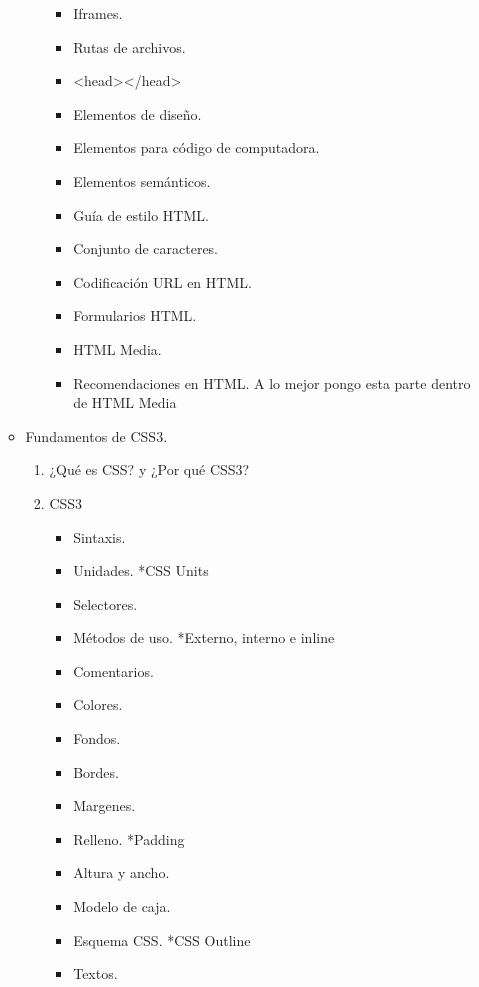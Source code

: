 \documentclass[12pt, letterpaper]{article}
\begin{document}
\begin{enumerate}
\begin{itemize}
\begin{enumerate}
\begin{itemize}
                \item Iframes.
                \item Rutas de archivos.
                \item <head></head>
                \item Elementos de diseño.
                \item Elementos para código de computadora.
                \item Elementos semánticos.
                \item Guía de estilo HTML.
                \item Conjunto de caracteres.
                \item Codificación URL en HTML.
                \item Formularios HTML.
                \item HTML Media.
                \item Recomendaciones en HTML. \newline*A lo mejor pongo esta parte dentro de HTML Media
            \end{itemize}
        \end{enumerate}
        \item Fundamentos de CSS3.
        \begin{enumerate}
            \item ¿Qué es CSS? y ¿Por qué CSS3?
            \item CSS3
            \begin{itemize}
                \item Sintaxis.
                \item Unidades. *CSS Units
                \item Selectores.
                \item Métodos de uso. *Externo, interno e inline
                \item Comentarios.
                \item Colores.
                \item Fondos.
                \item Bordes.
                \item Margenes.
                \item Relleno. *Padding
                \item Altura y ancho.
                \item Modelo de caja.
                \item Esquema CSS. *CSS Outline
                \item Textos.

\end{itemize}
\end{enumerate}
\end{itemize}
\end{enumerate}
\end{document}
